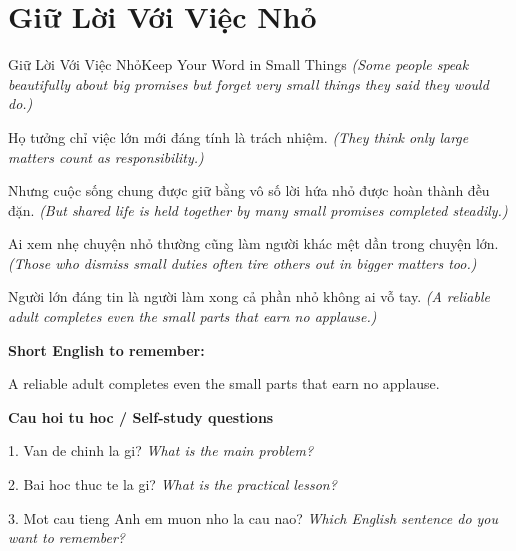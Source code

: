 \section{Giữ Lời Với Việc Nhỏ}
\begin{truyen}{Giữ Lời Với Việc Nhỏ}{Keep Your Word in Small Things}
\textit{(Some people speak beautifully about big promises but forget very small things they said they would do.)}

Họ tưởng chỉ việc lớn mới đáng tính là trách nhiệm.
\textit{(They think only large matters count as responsibility.)}

Nhưng cuộc sống chung được giữ bằng vô số lời hứa nhỏ được hoàn thành đều đặn.
\textit{(But shared life is held together by many small promises completed steadily.)}

Ai xem nhẹ chuyện nhỏ thường cũng làm người khác mệt dần trong chuyện lớn.
\textit{(Those who dismiss small duties often tire others out in bigger matters too.)}

\end{truyen}

\begin{baihoc}
Người lớn đáng tin là người làm xong cả phần nhỏ không ai vỗ tay.
\textit{(A reliable adult completes even the small parts that earn no applause.)}
\end{baihoc}

\begin{ghinhoanh}
\textbf{Short English to remember:}

A reliable adult completes even the small parts that earn no applause.

\end{ghinhoanh}

\begin{tuhocnhanh}
\textbf{Cau hoi tu hoc / Self-study questions}

1. Van de chinh la gi? \textit{What is the main problem?}

2. Bai hoc thuc te la gi? \textit{What is the practical lesson?}

3. Mot cau tieng Anh em muon nho la cau nao? \textit{Which English sentence do you want to remember?}
\end{tuhocnhanh}
\ngancach


